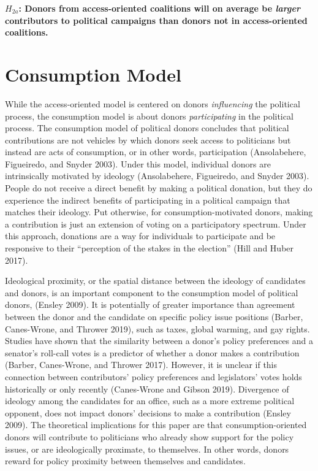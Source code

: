 \documentclass[12pt,]{article}
\begin{document}
\textbf{\(H_{2a}\): Donors from access-oriented coalitions will on
average be \emph{larger} contributors to political campaigns than donors
not in access-oriented coalitions.}

\hypertarget{consumption-model}{%
\section{Consumption Model}\label{consumption-model}}

While the access-oriented model is centered on donors \emph{influencing}
the political process, the consumption model is about donors
\emph{participating} in the political process. The consumption model of
political donors concludes that political contributions are not vehicles
by which donors seek access to politicians but instead are acts of
consumption, or in other words, participation (Ansolabehere, Figueiredo,
and Snyder 2003). Under this model, individual donors are intrinsically
motivated by ideology (Ansolabehere, Figueiredo, and Snyder 2003).
People do not receive a direct benefit by making a political donation,
but they do experience the indirect benefits of participating in a
political campaign that matches their ideology. Put otherwise, for
consumption-motivated donors, making a contribution is just an extension
of voting on a participatory spectrum. Under this approach, donations
are a way for individuals to participate and be responsive to their
``perception of the stakes in the election'' (Hill and Huber 2017).

Ideological proximity, or the spatial distance between the ideology of
candidates and donors, is an important component to the consumption
model of political donors, (Ensley 2009). It is potentially of greater
importance than agreement between the donor and the candidate on
specific policy issue positions (Barber, Canes-Wrone, and Thrower 2019),
such as taxes, global warming, and gay rights. Studies have shown that
the similarity between a donor's policy preferences and a senator's
roll-call votes is a predictor of whether a donor makes a contribution
(Barber, Canes-Wrone, and Thrower 2017). However, it is unclear if this
connection between contributors' policy preferences and legislators'
votes holds historically or only recently (Canes-Wrone and Gibson 2019).
Divergence of ideology among the candidates for an office, such as a
more extreme political opponent, does not impact donors' decisions to
make a contribution (Ensley 2009). The theoretical implications for this
paper are that consumption-oriented donors will contribute to
politicians who already show support for the policy issues, or are
ideologically proximate, to themselves. In other words, donors reward
for policy proximity between themselves and candidates.
\end{document}
